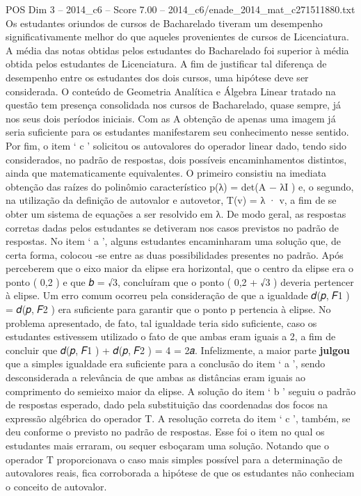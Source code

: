\begin{textsample}{POS Dim 3 – 2014\_c6 – Score 7.00 – 2014\_c6/enade\_2014\_mat\_c271511880.txt}
Os estudantes oriundos de cursos de Bacharelado tiveram um desempenho significativamente melhor do que aqueles provenientes de cursos de Licenciatura.
A média das notas obtidas pelos estudantes do Bacharelado foi superior à média obtida pelos estudantes de Licenciatura.
A fim de justificar tal diferença de desempenho entre os estudantes dos dois cursos, uma hipótese deve ser considerada.
O conteúdo de Geometria Analítica e Álgebra Linear tratado na questão tem presença consolidada nos cursos de Bacharelado, quase sempre, já nos seus dois períodos iniciais.
Com as A obtenção de apenas uma imagem já seria suficiente para os estudantes manifestarem seu conhecimento nesse sentido.
Por fim, o item ‘ c ’ solicitou os autovalores do operador linear dado, tendo sido considerados, no padrão de respostas, dois possíveis encaminhamentos distintos, ainda que matematicamente equivalentes.
O primeiro consistiu na imediata obtenção das raízes do polinômio característico p(λ) = det(A − λI ) e, o segundo, na utilização da definição de autovalor e autovetor, T(v) = λ · v, a fim de se obter um sistema de equações a ser resolvido em λ.
De modo geral, as respostas corretas dadas pelos estudantes se detiveram nos casos previstos no padrão de respostas.
No item ‘ a ’, alguns estudantes encaminharam uma solução que, de certa forma, colocou -se entre as duas possibilidades presentes no padrão.
Após perceberem que o eixo maior da elipse era horizontal, que o centro da elipse era o ponto ( 0,2 ) e que 𝑏 = √3, concluíram que o ponto ( 0,2 + √3 ) deveria pertencer à elipse.
Um erro comum ocorreu pela consideração de que a igualdade 𝑑(𝑝, 𝐹1 ) = 𝑑(𝑝, 𝐹2 ) era suficiente para garantir que o ponto p pertencia à elipse.
No problema apresentado, de fato, tal igualdade teria sido suficiente, caso os estudantes estivessem utilizado o fato de que ambas eram iguais a 2, a fim de concluir que 𝑑(𝑝, 𝐹1 ) + 𝑑(𝑝, 𝐹2 ) = 4 = 2𝑎.
Infelizmente, a maior parte \textbf{julgou} que a simples igualdade era suficiente para a conclusão do item ‘ a ’, sendo desconsiderada a relevância de que ambas as distâncias eram iguais ao comprimento do semieixo maior da elipse.
A solução do item ‘ b ’ seguiu o padrão de respostas esperado, dado pela substituição das coordenadas dos focos na expressão algébrica do operador T.
A resolução correta do item ‘ c ’, também, se deu conforme o previsto no padrão de respostas.
Esse foi o item no qual os estudantes mais erraram, ou sequer esboçaram uma solução.
Notando que o operador T proporcionava o caso mais simples possível para a determinação de autovalores reais, fica corroborada a hipótese de que os estudantes não conheciam o conceito de autovalor.

\end{textsample}

